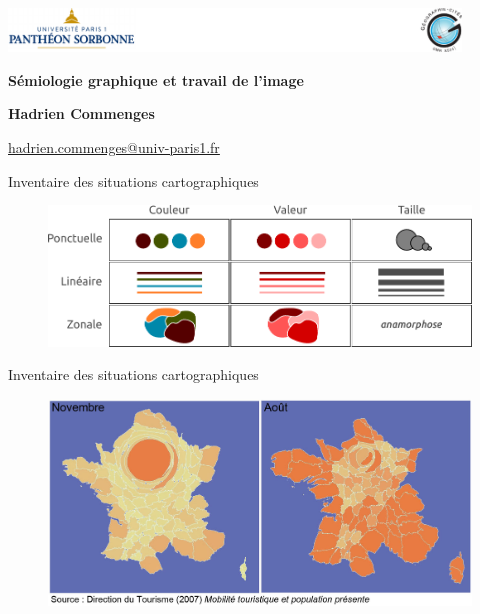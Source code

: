 \graphicspath{{IMAGE/}}

\begin{frame}

\includegraphics[width=12cm]{Logos.pdf}

\vfill

\begin{center}

\vspace*{1.5cm}

\LARGE
\textbf{Sémiologie graphique et travail de l'image}

\vspace*{2.5cm}

\large

\textbf{Hadrien Commenges}

{\small

\vspace*{0.1cm}

\url{hadrien.commenges@univ-paris1.fr}}

\end{center}

\end{frame}

\begin{frame}{Inventaire des situations cartographiques}

\begin{figure}
\includegraphics[width=12cm]{semio1.pdf}
\end{figure}

\end{frame}

\begin{frame}{Inventaire des situations cartographiques}

\begin{figure}
\includegraphics[width=12cm]{Anamorphose.jpg}
\end{figure}

\end{frame}


